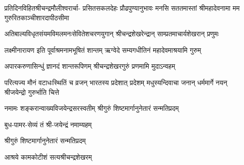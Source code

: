 \fourlineindentedshloka
{प्रतिदिनविहितश्रीचन्द्रमौलीश्वरार्चा-}
{प्रसितसकलदेहः प्रौढपुण्यानुभावः}
{मनसि सततमास्तां श्रीमहादेवनामा}
{मम गुरुरितकाञ्चीशारदापीठसीमा}%

\twolineshloka
{अतिबाल्यविधृतसंयमविमलमनःसेवितेशचरणयुगान्}
{श्रीचन्द्रशेखरेन्द्रान् साम्प्रतमाचार्यशेखरान् प्रणुमः}%

\twolineshloka
{लक्ष्मीनारायण इति पूर्वाश्रमनामभूषितं शान्तम्}
{ऋग्वेदे सम्यगधीतिनं महादेवमाश्रयामि गुरुम्}%

\twolineshloka
{अपारकरुणासिन्धुं ज्ञानदं शान्तरूपिणम्}
{श्रीचन्द्रशेखरगुरुं प्रणमामि मुदाऽन्वहम्}%

\fourlineindentedshloka
{परित्यज्य मौनं वटाधःस्थितिं च}
{व्रजन् भारतस्य प्रदेशात् प्रदेशम्}%
{मधुस्यन्दिवाचा जनान् धर्ममार्गे}
{नयन् श्रीजयेन्द्रो गुरुर्भाति चित्ते}%

\twolineshloka
{नमामः शङ्करान्वाख्यविजयेन्द्रसरस्वतीम्}
{श्रीगुरुं शिष्टमार्गानुनेतारं सन्मतिप्रदम्}%

{बुध-पामर-सेव्यं तं श्री-जयेन्द्रं नमाम्यहम्}

{श्रीगुरुं शिष्टमार्गानुनेतारं सन्मतिप्रदम्}

{आश्रये कामकोटीशं सत्यश्रीचन्द्रशेखरम्} 

